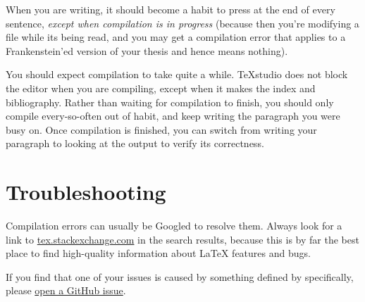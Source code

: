 When you are writing, it should become a habit to press  at the end of every sentence, \emph{except when compilation is in progress} (because then you're modifying a file while its being read, and you may get a compilation error that applies to a Frankenstein'ed version of your thesis and hence means nothing).

You should expect compilation to take quite a while. TeXstudio does not block the editor when you are compiling, except when it makes the index and bibliography. Rather than waiting for compilation to finish, you should only compile every-so-often out of habit, and keep writing the paragraph you were busy on. Once compilation is finished, you can switch from writing your paragraph to looking at the output to verify its correctness.


\section{Troubleshooting}
Compilation errors can usually be Googled to resolve them. Always look for a link to \href{https://tex.stackexchange.com/}{tex.stackexchange.com} in the search results, because this is by far the best place to find high-quality information about \LaTeX{} features and bugs.

If you find that one of your issues is caused by something defined by \repo specifically, please \href{https://github.com/bauwenst/bauwemt/issues}{open a GitHub issue}.
